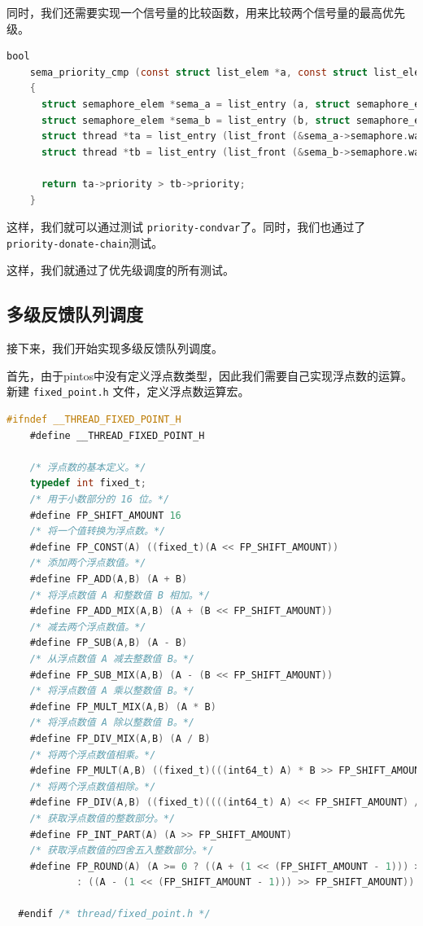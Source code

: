 \documentclass{article}
\begin{document}
同时，我们还需要实现一个信号量的比较函数，用来比较两个信号量的最高优先级。

\begin{lstlisting}[language=C, title=信号量比较函数]
    bool
    sema_priority_cmp (const struct list_elem *a, const struct list_elem *b, void *aux UNUSED)
    {
      struct semaphore_elem *sema_a = list_entry (a, struct semaphore_elem, elem);
      struct semaphore_elem *sema_b = list_entry (b, struct semaphore_elem, elem);
      struct thread *ta = list_entry (list_front (&sema_a->semaphore.waiters), struct thread, elem);
      struct thread *tb = list_entry (list_front (&sema_b->semaphore.waiters), struct thread, elem);
    
      return ta->priority > tb->priority;
    }
\end{lstlisting}

这样，我们就可以通过测试 \texttt{priority-condvar}了。同时，我们也通过了\texttt{priority-donate-chain}测试。

这样，我们就通过了优先级调度的所有测试。

\subsection{多级反馈队列调度}

接下来，我们开始实现多级反馈队列调度。

首先，由于pintos中没有定义浮点数类型，因此我们需要自己实现浮点数的运算。新建 \texttt{fixed\_point.h} 文件，定义浮点数运算宏。

\begin{lstlisting}[language=C, title=\texttt{fixed\_point.h}]
    #ifndef __THREAD_FIXED_POINT_H
    #define __THREAD_FIXED_POINT_H
    
    /* 浮点数的基本定义。*/
    typedef int fixed_t;
    /* 用于小数部分的 16 位。*/
    #define FP_SHIFT_AMOUNT 16
    /* 将一个值转换为浮点数。*/
    #define FP_CONST(A) ((fixed_t)(A << FP_SHIFT_AMOUNT))
    /* 添加两个浮点数值。*/
    #define FP_ADD(A,B) (A + B)
    /* 将浮点数值 A 和整数值 B 相加。*/
    #define FP_ADD_MIX(A,B) (A + (B << FP_SHIFT_AMOUNT))
    /* 减去两个浮点数值。*/
    #define FP_SUB(A,B) (A - B)
    /* 从浮点数值 A 减去整数值 B。*/
    #define FP_SUB_MIX(A,B) (A - (B << FP_SHIFT_AMOUNT))
    /* 将浮点数值 A 乘以整数值 B。*/
    #define FP_MULT_MIX(A,B) (A * B)
    /* 将浮点数值 A 除以整数值 B。*/
    #define FP_DIV_MIX(A,B) (A / B)
    /* 将两个浮点数值相乘。*/
    #define FP_MULT(A,B) ((fixed_t)(((int64_t) A) * B >> FP_SHIFT_AMOUNT))
    /* 将两个浮点数值相除。*/
    #define FP_DIV(A,B) ((fixed_t)((((int64_t) A) << FP_SHIFT_AMOUNT) / B))
    /* 获取浮点数值的整数部分。*/
    #define FP_INT_PART(A) (A >> FP_SHIFT_AMOUNT)
    /* 获取浮点数值的四舍五入整数部分。*/
    #define FP_ROUND(A) (A >= 0 ? ((A + (1 << (FP_SHIFT_AMOUNT - 1))) >> FP_SHIFT_AMOUNT) \
            : ((A - (1 << (FP_SHIFT_AMOUNT - 1))) >> FP_SHIFT_AMOUNT))
  
  #endif /* thread/fixed_point.h */
\end{lstlisting}
\end{document}
